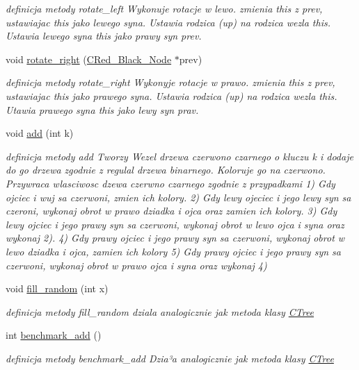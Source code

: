 \begin{DoxyCompactItemize}
\begin{DoxyCompactList}\small\item\em definicja metody rotate\+\_\+left Wykonuje rotacje w lewo. zmienia this z prev, ustawiajac this jako lewego syna. Ustawia rodzica (up) na rodzica wezla this. Ustawia lewego syna this jako prawy syn prev. \end{DoxyCompactList}\item 
void \hyperlink{class_c_red___black___tree_ae87e5b2ab2e9a50820f0dd239aafe53d}{rotate\+\_\+right} (\hyperlink{class_c_red___black___node}{C\+Red\+\_\+\+Black\+\_\+\+Node} $\ast$prev)
\begin{DoxyCompactList}\small\item\em definicja metody rotate\+\_\+right Wykonyje rotacje w prawo. zmienia this z prev, ustawiajac this jako prawego syna. Ustawia rodzica (up) na rodzica wezla this. Utawia prawego syna this jako lewy syn prav. \end{DoxyCompactList}\item 
void \hyperlink{class_c_red___black___tree_ad32e701bf765a0cab13e2a1e34a705da}{add} (int k)
\begin{DoxyCompactList}\small\item\em definicja metody add Tworzy Wezel drzewa czerwono czarnego o kluczu k i dodaje do go drzewa zgodnie z regulal drzewa binarnego. Koloruje go na czerwono. Przywraca wlasciwosc dzewa czerwno czarnego zgodnie z przypadkami 1) Gdy ojciec i wuj sa czerwoni, zmien ich kolory. 2) Gdy lewy ojeciec i jego lewy syn sa czeroni, wykonaj obrot w prawo dziadka i ojca oraz zamien ich kolory. 3) Gdy lewy ojciec i jego prawy syn sa czerwoni, wykonaj obrot w lewo ojca i syna oraz wykonaj 2). 4) Gdy prawy ojciec i jego prawy syn sa czerwoni, wykonaj obrot w lewo dziadka i ojca, zamien ich kolory 5) Gdy prawy ojciec i jego prawy syn sa czerwoni, wykonaj obrot w prawo ojca i syna oraz wykonaj 4) \end{DoxyCompactList}\item 
void \hyperlink{class_c_red___black___tree_af9db0c92540ec68ee99853ffaea1d992}{fill\+\_\+random} (int x)
\begin{DoxyCompactList}\small\item\em definicja metody fill\+\_\+random dziala analogicznie jak metoda klasy \hyperlink{class_c_tree}{C\+Tree} \end{DoxyCompactList}\item 
int \hyperlink{class_c_red___black___tree_a570c1be75c7fd9077c68393bea80b019}{benchmark\+\_\+add} ()
\begin{DoxyCompactList}\small\item\em definicja metody benchmark\+\_\+add Dzia³a analogicznie jak metoda klasy \hyperlink{class_c_tree}{C\+Tree} \end{DoxyCompactList}\item 

\end{DoxyCompactItemize}
